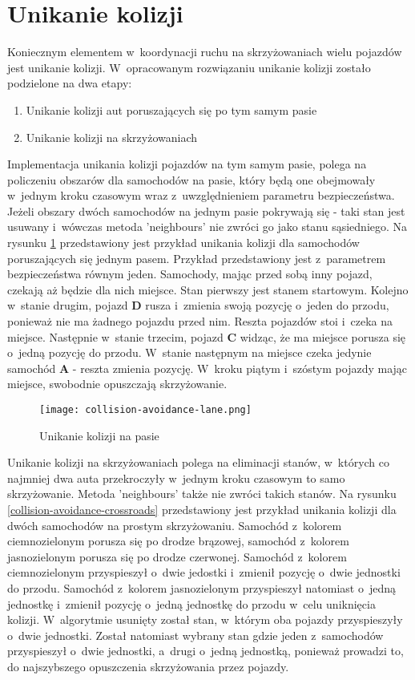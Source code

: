 \section{Unikanie kolizji}

Koniecznym elementem w~koordynacji ruchu na skrzyżowaniach wielu pojazdów jest unikanie kolizji. W~opracowanym rozwiązaniu unikanie kolizji zostało podzielone na dwa etapy:
\begin{enumerate}
\item Unikanie kolizji aut poruszających się po tym samym pasie
\item Unikanie kolizji na skrzyżowaniach
\end{enumerate}
Implementacja unikania kolizji pojazdów na tym samym pasie, polega na policzeniu obszarów dla samochodów na pasie, który będą one obejmowały w~jednym kroku czasowym wraz z~uwzględnieniem parametru bezpieczeństwa. Jeżeli obszary dwóch samochodów na jednym pasie pokrywają się - taki stan jest usuwany i~wówczas metoda 'neighbours' nie zwróci go jako stanu sąsiedniego. Na rysunku \ref{collision-avoidance-lane} przedstawiony jest przykład unikania kolizji dla samochodów poruszających się jednym pasem. Przykład przedstawiony jest z~parametrem bezpieczeństwa równym jeden. Samochody, mając przed sobą inny pojazd, czekają aż będzie dla nich miejsce. Stan pierwszy jest stanem startowym. Kolejno w~stanie drugim, pojazd \textbf{D} rusza i~zmienia swoją pozycję o~jeden do przodu, ponieważ nie ma żadnego pojazdu przed nim. Reszta pojazdów stoi i~czeka na miejsce. Następnie w~stanie trzecim, pojazd \textbf{C} widząc, że ma miejsce porusza się o~jedną pozycję do przodu. W~stanie następnym na miejsce czeka jedynie samochód \textbf{A} - reszta zmienia pozycję. W~kroku piątym i~szóstym pojazdy mając miejsce, swobodnie opuszczają skrzyżowanie.
\begin{figure}[H]
    \texttt{[image: collision-avoidance-lane.png]}
  \caption{Unikanie kolizji na pasie}
  \label{collision-avoidance-lane}
\end{figure}
\newpage
Unikanie kolizji na skrzyżowaniach polega na eliminacji stanów, w~których co najmniej dwa auta przekroczyły w~jednym kroku czasowym to samo skrzyżowanie. Metoda 'neighbours' także nie zwróci takich stanów. Na rysunku \ref{collision-avoidance-crossroads} przedstawiony jest przykład unikania kolizji dla dwóch samochodów na prostym skrzyżowaniu. Samochód z~kolorem ciemnozielonym porusza się po drodze brązowej, samochód z~kolorem jasnozielonym porusza się po drodze czerwonej. Samochód z~kolorem ciemnozielonym przyspieszył o~dwie jedostki i~zmienił pozycję o~dwie jednostki do przodu. Samochód z~kolorem jasnozielonym przyspieszył natomiast o~jedną jednostkę i~zmienił pozycję o~jedną jednostkę do przodu w~celu uniknięcia kolizji. W~algorytmie usunięty został stan, w~którym oba pojazdy przyspieszyły o~dwie jednostki. Został natomiast wybrany stan gdzie jeden z~samochodów przyspieszył o~dwie jednostki, a~drugi o~jedną jednostką, ponieważ prowadzi to, do najszybszego opuszczenia skrzyżowania przez pojazdy.
